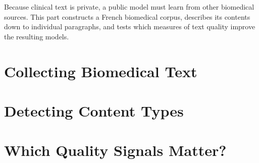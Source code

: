 
\begin{reviewread}
Because clinical text is private, a public model must learn from other biomedical
sources. This part constructs a French biomedical corpus, describes its contents
down to individual paragraphs, and tests which measures of text quality improve
the resulting models.
\end{reviewread}

\chapter{Collecting Biomedical Text}
\label{chap:collecting}


\chapter{Detecting Content Types}
\label{chap:quality}


\chapter{Which Quality Signals Matter?}
\label{chap:mcbio}

